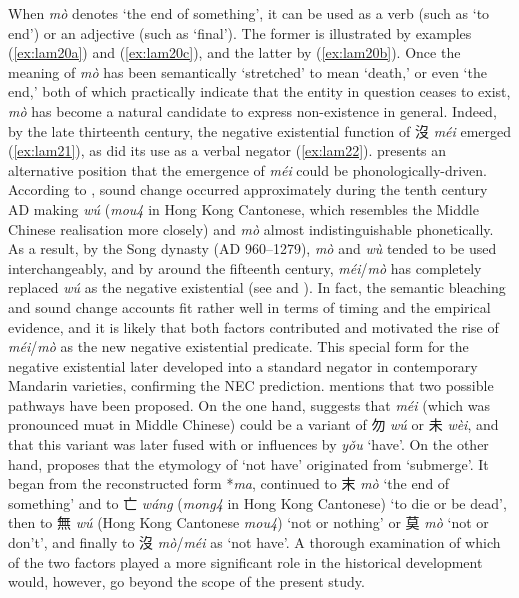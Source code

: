 \documentclass[output=paper]{langscibook}
\begin{document}
When \textit{mò} denotes `the end of something', it can be used as a verb (such as `to end') or an adjective (such as `final'). The former is illustrated by examples (\ref{ex:lam20a}) and (\ref{ex:lam20c}), and the latter by (\ref{ex:lam20b}). Once the meaning of \textit{mò} has been semantically `stretched' to mean `death,' or even `the end,' both of which practically indicate that the entity in question ceases to exist, \textit{mò} has become a natural candidate to express non-existence in general. Indeed, by the late thirteenth century, the negative existential function of 沒 \textit{méi} emerged (\ref{ex:lam21}), as did its use as a verbal negator (\ref{ex:lam22}). \citet{Xu2003} presents an alternative position that the emergence of \textit{méi} could be phonologically-driven. According to \citeauthor{Xu2003}, sound change occurred approximately during the tenth century AD making \textit{wú} (\textit{mou4} in Hong Kong Cantonese, which resembles the Middle Chinese realisation more closely) and \textit{mò} almost indistinguishable phonetically. As a result, by the Song dynasty (AD 960–1279), \textit{mò} and \textit{wù} tended to be used interchangeably, and by around the fifteenth century, \textit{méi}/\textit{mò} has completely replaced \textit{wú} as the negative existential (see \citealt{PanW2002} and \citealt{Xu2003}). In fact, the semantic bleaching and sound change accounts fit rather well in terms of timing and the empirical evidence, and it is likely that both factors contributed and motivated the rise of \textit{méi}/\textit{mò} as the new negative existential predicate. This special form for the negative existential later developed into a standard negator in contemporary Mandarin varieties, confirming the NEC prediction. \citet[376--377, 517--518]{Schuessler2007} mentions that two possible pathways have been proposed. On the one hand, \citet[126]{Norman1988} suggests that \textit{méi} (which was pronounced muət in Middle Chinese) could be a variant of 勿 \textit{wú} or 未 \textit{wèi}, and that this variant was later fused with or influences by \textit{yǒu} `have'. On the other hand, \citet[121]{Pulleyblank1973} proposes that the etymology of `not have' originated from `submerge'. It began from the reconstructed form *\textit{ma}, continued to 末 \textit{mò} `the end of something' and to 亡 \textit{wáng} (\textit{mong4} in Hong Kong Cantonese) `to die or be dead', then to 無 \textit{wú} (Hong Kong Cantonese \textit{mou4}) `not or nothing' or 莫 \textit{mò} `not or don't', and finally to 沒 \textit{mò}/\textit{méi} as `not have'. A thorough examination of which of the two factors played a more significant role in the historical development would, however, go beyond the scope of the present study. 
\end{document}
